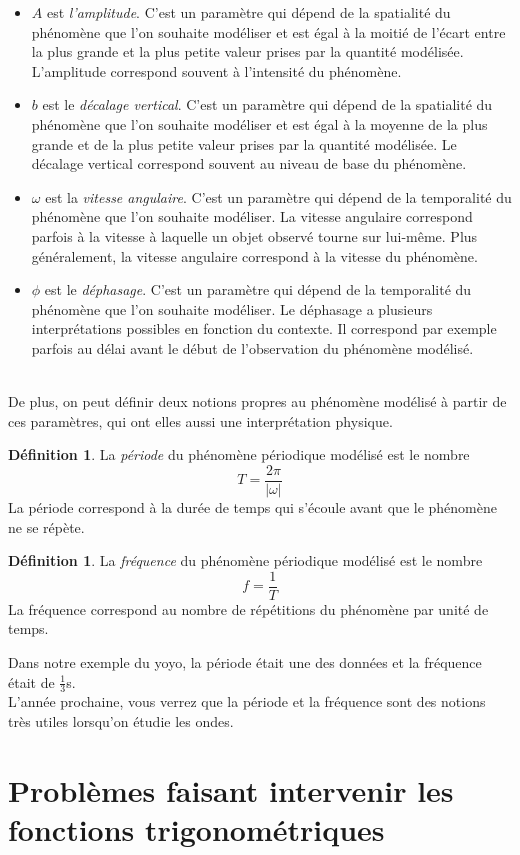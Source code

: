 \documentclass[a4paper,fontsize=13pt]{scrreprt}
\theoremstyle{plain}
\theoremstyle{definition}
\newtheorem{déf}[subsection]{Définition}
\begin{document}
\begin{itemize}
\item $A$ est \emph{l'amplitude}. C'est un paramètre qui dépend de la spatialité du phénomène que l'on souhaite modéliser et est égal à la moitié de l'écart entre la plus grande et la plus petite valeur prises par la quantité modélisée. L'amplitude correspond souvent à \og l'intensité \fg{} du phénomène.
\item $b$ est le \emph{décalage vertical}. C'est un paramètre qui dépend de la spatialité du phénomène que l'on souhaite modéliser et est égal à la moyenne de la plus grande et de la plus petite valeur prises par la quantité modélisée. Le décalage vertical correspond souvent au \og niveau de base \fg{} du phénomène.
\item $\omega$ est la \emph{vitesse angulaire}. C'est un paramètre qui dépend de la temporalité du phénomène que l'on souhaite modéliser. La vitesse angulaire correspond parfois à la vitesse à laquelle un objet observé tourne sur lui-même. Plus généralement, la vitesse angulaire correspond à la \og vitesse \fg{} du phénomène.
\item $\phi$ est le \emph{déphasage}. C'est un paramètre qui dépend de la temporalité du phénomène que l'on souhaite modéliser. Le déphasage a plusieurs interprétations possibles en fonction du contexte. Il correspond par exemple parfois au délai avant le début de l'observation du phénomène modélisé.
\end{itemize}~~\\
De plus, on peut définir deux notions propres au phénomène modélisé à partir de ces paramètres, qui ont elles aussi une interprétation physique.
\newpage
\begin{déf}
La \emph{période} du phénomène périodique modélisé est le nombre $$T = \frac{2\pi}{|\omega|}$$
La période correspond à la durée de temps qui s'écoule avant que le phénomène ne se répète.
\end{déf}
\begin{déf}
La \emph{fréquence} du phénomène périodique modélisé est le nombre $$f = \frac{1}{T}$$
La fréquence correspond au nombre de répétitions du phénomène par unité de temps.
\end{déf}
Dans notre exemple du yoyo, la période était une des données et la fréquence était de $\frac{1}{3}$s. \\
L'année prochaine, vous verrez que la période et la fréquence sont des notions très utiles lorsqu'on étudie les ondes.

\section{Problèmes faisant intervenir les fonctions trigonométriques}
\end{document}
